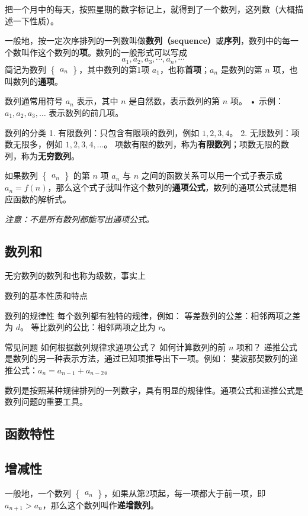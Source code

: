 把一个月中的每天，按照星期的数字标记上，就得到了一个数列，这列数（大概描述一下性质）。

一般地，按一定次序排列的一列数叫做\textbf{数列（sequence）}或\textbf{序列}，数列中的每一个数叫作这个数列的\textbf{项}。数列的一般形式可以写成
\begin{equation}
a_1,a_2,a_3,\cdots,a_n,\cdots~
\end{equation}
简记为数列 $\begin{Bmatrix} a_n \end{Bmatrix}$，其中数列的第1项 $a_1$，也称\textbf{首项}；$a_n$ 是数列的第 $n$ 项，也叫数列的\textbf{通项}。

数列通常用符号 $a_n$ 表示，其中 $n$ 是自然数，表示数列的第 $n$ 项。
	•	示例：$a_1, a_2, a_3, \dots$ 表示数列的前几项。

数列的分类
	1.	有限数列：只包含有限项的数列，例如 $1, 2, 3, 4$。
	2.	无限数列：项数无限多，例如 $1, 2, 3, 4, \dots$。
项数有限的数列，称为\textbf{有限数列}；项数无限的数列，称为\textbf{无穷数列}。

如果数列 $\begin{Bmatrix} a_n \end{Bmatrix}$ 的第 $n$ 项 $a_n$ 与 $n$ 之间的函数关系可以用一个式子表示成 $a_n = f(n)$，那么这个式子就叫作这个数列的\textbf{通项公式}，数列的通项公式就是相应函数的解析式。

\textsl{注意：不是所有数列都能写出通项公式。}

\subsection{数列和}

无穷数列的数列和也称为级数，事实上


数列的基本性质和特点

数列的规律性
每个数列都有独特的规律，例如：
等差数列的公差：相邻两项之差为 $d$。
等比数列的公比：相邻两项之比为 $r$。

常见问题
如何根据数列规律求通项公式？
如何计算数列的前 $n$ 项和？
递推公式是数列的另一种表示方法，通过已知项推导出下一项。例如：
斐波那契数列的递推公式：$a_n = a_{n-1} + a_{n-2}$。

数列是按照某种规律排列的一列数字，具有明显的规律性。通项公式和递推公式是数列问题的重要工具。
\subsection{函数特性}

\subsection{增减性}
一般地，一个数列 $\begin{Bmatrix} a_n \end{Bmatrix}$，如果从第2项起，每一项都大于前一项，即 $a_{n+1}>a_n$，那么这个数列叫作\textbf{递增数列}。

